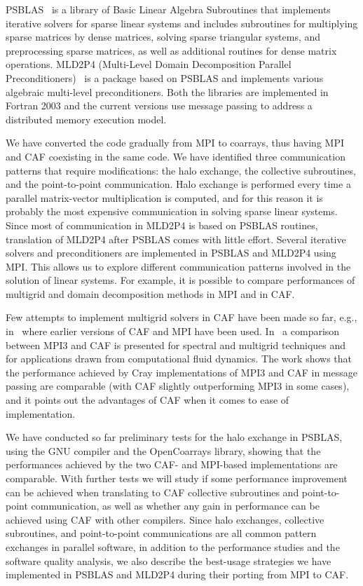 \documentclass{IOS-Book-Article}
\begin{document}
PSBLAS~\cite{PSBLAS, PSBLAS3}  is a library of Basic Linear Algebra Subroutines that implements iterative solvers for sparse linear systems and includes subroutines for multiplying sparse matrices by dense matrices, solving sparse triangular systems, and preprocessing sparse matrices, as well as additional routines for dense matrix operations. 
MLD2P4 (Multi-Level Domain Decomposition Parallel Preconditioners)~\cite{mld-toms}  is a package based on PSBLAS and implements various algebraic multi-level preconditioners. 
Both the libraries are implemented in Fortran 2003 and the current versions use message passing to address a distributed memory execution model. 

We have converted the code gradually from MPI to coarrays, thus having MPI and CAF coexisting in the same code. 
We have identified three communication patterns that require modifications: the halo exchange, the collective subroutines, and the point-to-point communication. 
Halo exchange is performed every time a parallel matrix-vector multiplication is computed, and for this reason it is probably the most expensive communication in solving sparse linear systems. Since most of communication in MLD2P4 is based on PSBLAS routines, translation of MLD2P4 after PSBLAS comes with little effort.
Several iterative solvers and preconditioners are implemented in PSBLAS and MLD2P4 using MPI. This allows us to explore different communication patterns involved in the solution of linear systems. For example, it is possible to compare performances of multigrid and domain decomposition methods in MPI and in CAF. 

Few attempts to implement multigrid solvers in CAF have been made so far, e.g., in~\cite{Numrich:1998} where earlier versions of CAF and MPI have been used.  
In~\cite{Garain:2015} a comparison between MPI3 and CAF is presented for spectral and multigrid techniques and for applications drawn from computational fluid dynamics. 
The work shows that the performance achieved by Cray implementations of MPI3 and CAF in message passing are comparable (with CAF slightly outperforming MPI3 in some cases), and it points out the advantages of CAF when it comes to ease of implementation. 

We have conducted so far preliminary tests for the halo exchange in PSBLAS, using the GNU compiler and the OpenCoarrays library, 
showing that the performances achieved by the two CAF- and MPI-based implementations are  comparable. 
With further tests we will study if some performance improvement can be achieved when translating to CAF collective subroutines and point-to-point communication, 
as well as whether any gain in performance can be achieved using CAF with other compilers. 
Since halo exchanges, collective subroutines, and point-to-point communications are all common pattern exchanges in parallel software, 
in addition to the performance studies and the software quality analysis,   
we also describe the best-usage strategies we have implemented in PSBLAS and MLD2P4 during their porting from MPI to CAF.



\end{document}
